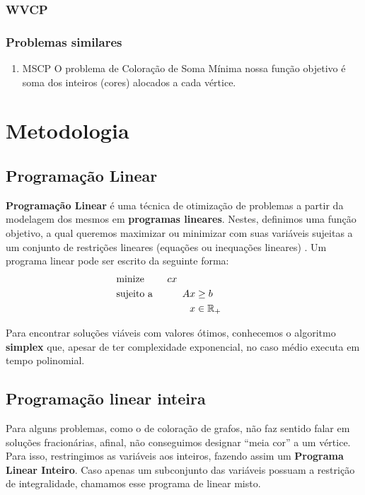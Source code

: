 \documentclass[11pt]{article}
\begin{document}
\subsubsection{WVCP}
\label{sec:org596ef85}
\subsubsection{Problemas similares}
\label{sec:org728b019}
\begin{enumerate}
\item MSCP
\label{sec:org1e59a3d}
O problema de Coloração de Soma Mínima nossa função objetivo é soma dos inteiros (cores) alocados a cada vértice.
\end{enumerate}
\section{Metodologia}
\label{sec:org46a2aec}
\subsection{Programação Linear}
\label{sec:org398a295}
\textbf{Programação Linear} é uma técnica de otimização de problemas a partir da modelagem dos mesmos em \textbf{programas lineares}.
Nestes, definimos uma função objetivo, a qual queremos maximizar ou minimizar com suas variáveis sujeitas a um conjunto de restrições lineares (equações ou inequações lineares) \textcite{Chvatal1983LinearProgramming} . Um programa linear pode ser escrito da seguinte forma:
\begin{alignat*}{4}
& \omit\rlap{minize \quad \quad $\displaystyle cx$} \\
& \mbox{sujeito a}&& \quad & Ax & \geq b  & \quad &  \\
&                 &&       & x               & \in \mathbb{R}_+ &      &
\end{alignat*}

Para encontrar soluções viáveis com valores ótimos, conhecemos o algoritmo \textbf{simplex} que, apesar de ter complexidade exponencial, no caso médio executa em tempo polinomial.

\subsection{Programação linear inteira}
\label{sec:orgcb406a1}
Para alguns problemas, como o de coloração de grafos, não faz sentido falar em soluções fracionárias, afinal, não conseguimos designar ``meia cor'' a um vértice.
Para isso, restringimos as variáveis aos inteiros, fazendo assim um \textbf{Programa Linear Inteiro}. Caso apenas um subconjunto das variáveis possuam a restrição de integralidade, chamamos esse programa de linear misto.
\end{document}
